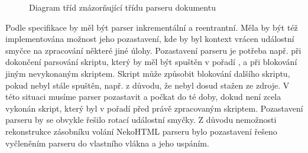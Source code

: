 \begin{figure}[H]
  \begin{center}
    \caption{Diagram tříd znázorňující třídu parseru dokumentu}
    \label{Figure.DocumentParser}
  \end{center}
\end{figure}

Podle specifikace by měl být parser inkrementální a reentrantní. Měla by být též implementována možnost jeho pozastavení, kde by byl kontext vrácen událostní smyčce na zpracování některé jiné úlohy. Pozastavení parseru je potřeba např. při dokončení parsování skriptu, který by měl být spuštěn v pořadí , a při blokování jiným nevykonaným skriptem. Skript může způsobit blokování dalšího skriptu, pokud nebyl stále spuštěn, např. z důvodu, že nebyl dosud stažen ze zdroje. V této situaci musíme parser pozastavit a počkat do té doby, dokud není zcela vykonán skript, který byl v pořadí před právě zpracovaným skriptem. Pozastavení parseru by se obvykle řešilo rotací událostní smyčky. Z důvodu nemožnosti rekonstrukce zásobníku volání NekoHTML parseru bylo pozastavení řešeno vyčleněním parseru do vlastního vlákna a jeho uspáním.

